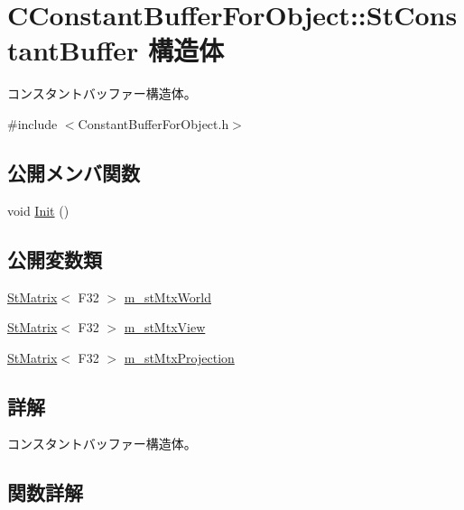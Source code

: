 \hypertarget{struct_c_constant_buffer_for_object_1_1_st_constant_buffer}{}\section{C\+Constant\+Buffer\+For\+Object\+:\+:St\+Constant\+Buffer 構造体}
\label{struct_c_constant_buffer_for_object_1_1_st_constant_buffer}


コンスタントバッファー構造体。  




{\ttfamily \#include $<$Constant\+Buffer\+For\+Object.\+h$>$}

\subsection*{公開メンバ関数}
\begin{DoxyCompactItemize}
\item 
void \hyperlink{struct_c_constant_buffer_for_object_1_1_st_constant_buffer_afc161d34c410eff7479fde11c9350374}{Init} ()
\end{DoxyCompactItemize}
\subsection*{公開変数類}
\begin{DoxyCompactItemize}
\item 
\hyperlink{struct_st_matrix}{St\+Matrix}$<$ F32 $>$ \hyperlink{struct_c_constant_buffer_for_object_1_1_st_constant_buffer_ad9f4abda99ca8f74484d3b965dea439b}{m\+\_\+st\+Mtx\+World}
\item 
\hyperlink{struct_st_matrix}{St\+Matrix}$<$ F32 $>$ \hyperlink{struct_c_constant_buffer_for_object_1_1_st_constant_buffer_a60dc78875ce1e9c5864de6b95dea49d9}{m\+\_\+st\+Mtx\+View}
\item 
\hyperlink{struct_st_matrix}{St\+Matrix}$<$ F32 $>$ \hyperlink{struct_c_constant_buffer_for_object_1_1_st_constant_buffer_adbff5690d0878dd28ee24a2806cbd054}{m\+\_\+st\+Mtx\+Projection}
\end{DoxyCompactItemize}


\subsection{詳解}
コンスタントバッファー構造体。 

\subsection{関数詳解}
\hypertarget{struct_c_constant_buffer_for_object_1_1_st_constant_buffer_afc161d34c410eff7479fde11c9350374}{}
